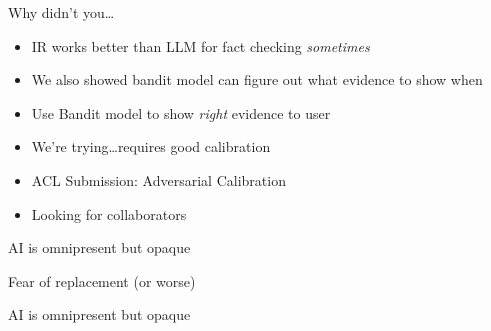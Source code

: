 \documentclass[compress]{beamer}
\newcommand{\fsi}[2]{
\begin{frame}[plain]
\vspace*{-1pt}
\makebox[\linewidth]{\texttt{[image: \#1]}}
\begin{center}
#2
\end{center}
\end{frame}
}
\newif\iflong\longfalse
\begin{document}
\begin{frame}{Why didn't you\dots}
	\begin{itemize}
		\item IR works better than LLM for fact checking \emph{sometimes}
		\item We also showed bandit model can figure out what evidence to show when
		\item Use Bandit model to show \emph{right} evidence to user
		\pause
		\item We're trying\dots requires good calibration
		\item ACL Submission: Adversarial Calibration
		\item Looking for collaborators
	\end{itemize}
\end{frame}


\fsi{general_figures/black_box_outline}{AI is omnipresent but opaque}
\fsi{general_figures/kill_all_humans}{Fear of replacement (or worse)}
\fsi{general_figures/blackbox}{AI is omnipresent but opaque}
\fsi{general_figures/tng_poker}{}

\fsi{advcal/qanta_2025}{}

\iflong
\end{document}
